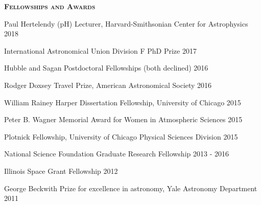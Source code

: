 \documentclass[12pt,letterpaper]{article}
\begin{document}
\vspace{5mm}
\textbf{\textsc{Fellowships and Awards}}
\begin{compactitem}[]
\item Paul Hertelendy (pH) Lecturer, Harvard-Smithsonian Center for Astrophysics \hfill 2018 
\item International Astronomical Union Division F PhD Prize \hfill 2017
\item Hubble and Sagan Postdoctoral Fellowships (both declined) \hfill 2016
\item Rodger Doxsey Travel Prize, American Astronomical Society \hfill 2016
\item William Rainey Harper Dissertation Fellowship, University of Chicago \hfill 2015
\item Peter B. Wagner Memorial Award for Women in Atmospheric Sciences \hfill 2015
\item Plotnick Fellowship, University of Chicago Physical Sciences Division \hfill 2015
\item National Science Foundation Graduate Research Fellowship \hfill 2013 - 2016
\item Illinois Space Grant Fellowship \hfill 2012
\item George Beckwith Prize for excellence in astronomy, Yale Astronomy Department \hfill2011
\end{compactitem}
\vspace{6mm}
\end{document}
